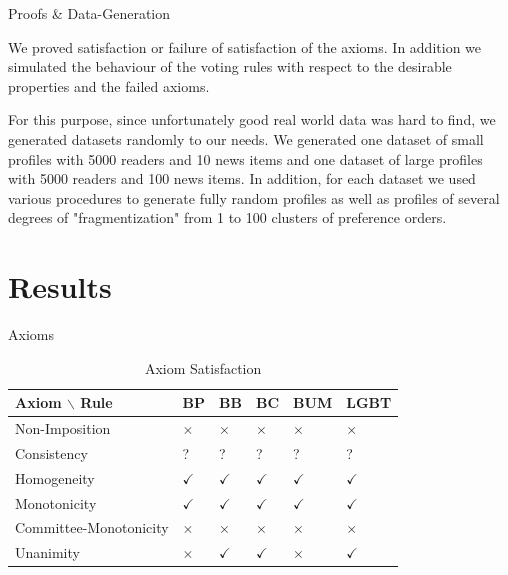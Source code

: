\documentclass{beamer}
\begin{document}
\begin{frame}{Proofs \& Data-Generation}

We proved satisfaction or failure of satisfaction of the axioms. In addition we simulated the behaviour of the voting rules with respect to the desirable properties and the failed axioms. 

For this purpose, since unfortunately good real world data was hard to find, we generated datasets randomly to our needs. We generated one dataset of small profiles with 5000 readers and 10 news items and one dataset of large profiles with 5000 readers and 100 news items. In addition, for each dataset we used various procedures to generate fully random profiles as well as profiles of several degrees of "fragmentization" from 1 to 100 clusters of preference orders.

\end{frame}



\section{Results}

\begin{frame}{Axioms}
	
	\begin{table}[]
		\centering
		\caption{Axiom Satisfaction}
		\label{my-label}
		\begin{tabular}{|l|l|l|l|l|l|}
			\hline
			Axiom $\backslash$ Rule  & BP       & BB       & BC        & BUM       & LGBT \\ \hline
			Non-Imposition         & $\times$ & $\times$ & $\times$  & $\times$  & $\times$  \\ \hline
			Consistency            & ?        & ?        & ?         & ?         & ?         \\ \hline
			Homogeneity        & $\checkmark$ & $\checkmark$  & $\checkmark$   & $\checkmark$ & $\checkmark$ \\ \hline
			Monotonicity     & $\checkmark$  & $\checkmark$  & $\checkmark$ & $\checkmark$   & $\checkmark$ \\ \hline
			Committee-Monotonicity & $\times$  & $\times$      & $\times$     & $\times$      & $\times$  \\ \hline
			Unanimity              & $\times$  & $\checkmark$  & $\checkmark$ & $\times$      & $\checkmark$ \\ \hline
		\end{tabular}
	\end{table}
\end{frame}
\end{document}
